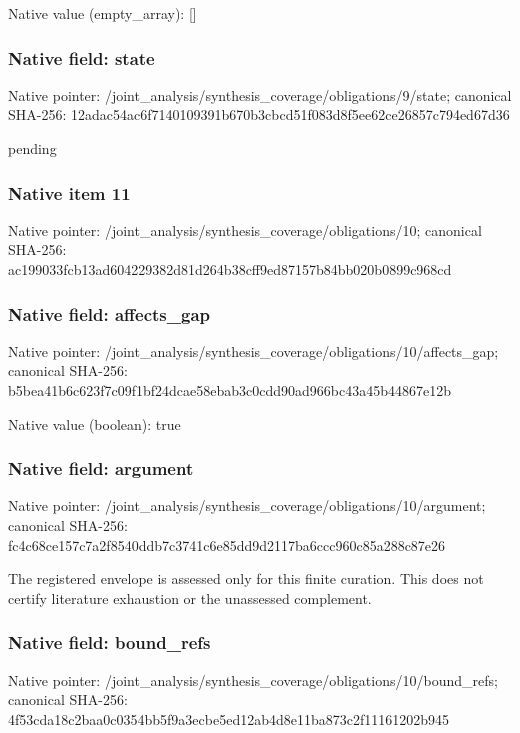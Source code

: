 \documentclass[10pt,a4paper]{article}
\begin{document}
Native value (empty\_\allowbreak{}array): []

\subsubsection{Native field: state}
Native pointer: /joint\_\allowbreak{}analysis/synthesis\_\allowbreak{}coverage/obligations/9/state; canonical SHA-256: 12adac54ac6f7140109391b670b3cbcd51f083d8f5ee62ce26857c794ed67d36

\begingroup\raggedright\sloppy pending\par\endgroup

\subsubsection{Native item 11}
Native pointer: /joint\_\allowbreak{}analysis/synthesis\_\allowbreak{}coverage/obligations/10; canonical SHA-256: ac199033fcb13ad604229382d81d264b38cff9ed87157b84bb020b0899c968cd

\subsubsection{Native field: affects\_\allowbreak{}gap}
Native pointer: /joint\_\allowbreak{}analysis/synthesis\_\allowbreak{}coverage/obligations/10/affects\_\allowbreak{}gap; canonical SHA-256: b5bea41b6c623f7c09f1bf24dcae58ebab3c0cdd90ad966bc43a45b44867e12b

Native value (boolean): true

\subsubsection{Native field: argument}
Native pointer: /joint\_\allowbreak{}analysis/synthesis\_\allowbreak{}coverage/obligations/10/argument; canonical SHA-256: fc4c68ce157c7a2f8540ddb7c3741c6e85dd9d2117ba6ccc960c85a288c87e26

\begingroup\raggedright\sloppy The registered envelope is assessed only for this finite curation. This does not certify literature exhaustion or the unassessed complement.\par\endgroup

\subsubsection{Native field: bound\_\allowbreak{}refs}
Native pointer: /joint\_\allowbreak{}analysis/synthesis\_\allowbreak{}coverage/obligations/10/bound\_\allowbreak{}refs; canonical SHA-256: 4f53cda18c2baa0c0354bb5f9a3ecbe5ed12ab4d8e11ba873c2f11161202b945
\end{document}
